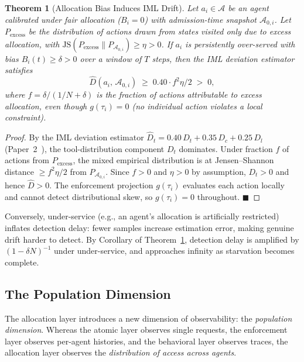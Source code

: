 \documentclass[11pt]{article}
\newtheorem{theorem}{Theorem}[section]
\newcommand{\Agents}{\mathcal{A}}
\newcommand{\Dhat}{\widehat{D}}
\begin{document}
\begin{theorem}[Allocation Bias Induces IML Drift]
\label{thm:bias-drift}
Let $a_i \in \Agents$ be an agent calibrated under fair allocation ($B_i = 0$) with
admission-time snapshot $\mathcal{A}_{0,i}$. Let $P_{\mathrm{excess}}$ be the distribution of
actions drawn from states visited only due to excess allocation, with
$\mathrm{JS}(P_{\mathrm{excess}} \| P_{\mathcal{A}_{0,i}}) \geq \eta > 0$. If $a_i$ is
persistently over-served with bias $B_i(t) \geq \delta > 0$ over a window of $T$ steps,
then the IML deviation estimator satisfies
\[
  \widehat{D}(a_i,\,\mathcal{A}_{0,i}) \;\geq\; 0.40 \cdot f^2 \eta / 2 \;>\; 0,
\]
where $f = \delta/(1/N + \delta)$ is the fraction of actions attributable to excess
allocation, even though $g(\tau_i) = 0$ (no individual action violates a local constraint).
\end{theorem}

\begin{proof}
By the IML deviation estimator $\Dhat_t = 0.40\,D_t + 0.35\,D_c + 0.25\,D_l$
(Paper~2~\cite{fernandez2026c}), the tool-distribution component $D_t$ dominates.
Under fraction $f$ of actions from $P_{\mathrm{excess}}$, the mixed empirical distribution
is at Jensen--Shannon distance $\geq f^2 \eta / 2$ from $P_{\mathcal{A}_{0,i}}$. Since $f > 0$
and $\eta > 0$ by assumption, $D_t > 0$ and hence $\Dhat > 0$. The enforcement
projection $g(\tau_i)$ evaluates each action locally and cannot detect distributional
skew, so $g(\tau_i) = 0$ throughout. \hfill $\blacksquare$
\end{proof}

Conversely, under-service (e.g., an agent's allocation is artificially restricted) inflates
detection delay: fewer samples increase estimation error, making genuine drift harder to
detect. By Corollary of Theorem~\ref{thm:bias-drift}, detection delay is amplified by
$(1 - \delta N)^{-1}$ under under-service, and approaches infinity as starvation becomes
complete.

\subsection{The Population Dimension}

The allocation layer introduces a new dimension of observability: the \emph{population dimension}. Whereas the atomic layer observes single requests, the enforcement layer observes per-agent histories, and the behavioral layer observes traces, the allocation layer observes the \emph{distribution of access across agents}.
\end{document}
